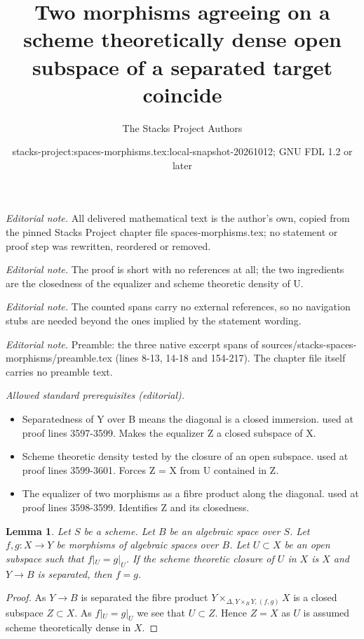 \documentclass[10pt,a4paper]{amsart}
\title{Two morphisms agreeing on a scheme theoretically dense open subspace of a separated target coincide}
\author{The Stacks Project Authors}
\date{stacks-project:spaces-morphisms.tex:local-snapshot-20261012; GNU FDL 1.2 or later}
\theoremstyle{plain}
\newtheorem{lemma}[subsection]{Lemma}
\theoremstyle{definition}
\theoremstyle{remark}
\numberwithin{equation}{subsection}
\begin{document}
\maketitle
\setcounter{subsection}{1}
\noindent\textit{Editorial note.} All delivered mathematical text is the author's own, copied from the pinned Stacks Project chapter file spaces-morphisms.tex; no statement or proof step was rewritten, reordered or removed.\par\medskip
\noindent\textit{Editorial note.} The proof is short with no references at all; the two ingredients are the closedness of the equalizer and scheme theoretic density of U.\par\medskip
\noindent\textit{Editorial note.} The counted spans carry no external references, so no navigation stubs are needed beyond the ones implied by the statement wording.\par\medskip
\noindent\textit{Editorial note.} Preamble: the three native excerpt spans of sources/stacks-spaces-morphisms/preamble.tex (lines 8-13, 14-18 and 154-217). The chapter file itself carries no preamble text.\par\medskip
\noindent\textit{Allowed standard prerequisites (editorial).}\begin{itemize}
\item Separatedness of Y over B means the diagonal is a closed immersion. used at proof lines 3597-3599. Makes the equalizer Z a closed subspace of X.
\item Scheme theoretic density tested by the closure of an open subspace. used at proof lines 3599-3601. Forces Z = X from U contained in Z.
\item The equalizer of two morphisms as a fibre product along the diagonal. used at proof lines 3598-3599. Identifies Z and its closedness.
\end{itemize}\medskip
\begin{lemma}
\label{lemma-equality-of-morphisms}
Let $S$ be a scheme. Let $B$ be an algebraic space over $S$.
Let $f, g : X \to Y$ be morphisms of algebraic spaces over $B$.
Let $U \subset X$ be an open subspace such that
$f|_U = g|_U$. If the scheme theoretic closure of $U$
in $X$ is $X$ and $Y \to B$ is separated, then $f = g$.
\end{lemma}

\begin{proof}
As $Y \to B$ is separated the fibre product
$Y \times_{\Delta, Y \times_B Y, (f, g)} X$ is a closed subspace $Z \subset X$. 
As $f|_U = g|_U$ we see that $U \subset Z$. Hence $Z = X$ as $U$ is assumed
scheme theoretically dense in $X$.
\end{proof}
\end{document}
